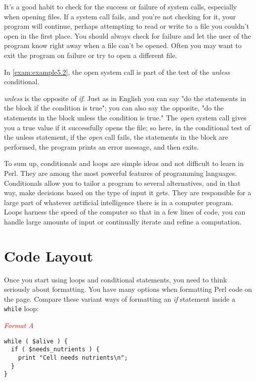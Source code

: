 It's a good habit to check for the success or failure of system calls, especially when opening files. If a system call fails, and you're not checking for it, your program will continue, perhaps attempting to read or write to a file you couldn't open in the first place. You should always check for failure and let the user of the program know right away when a file can't be opened. Often you may want to exit the program on failure or try to open a different file.  

In \autoref{exam:example5.2}, the open system call is part of the test of the \textit{unless} conditional.

\textit{unless} is the opposite of \textit{if}. Just as in English you can say "do the statements in the block if the condition is true"; you can also say the opposite, "do the statements in the block unless the condition is true." The \textit{open} system call gives you a true value if it successfully opens the file; so here, in the conditional test of the unless statement, if the \textit{open} call fails, the statements in the block are performed, the program prints an error message, and then exits.

To sum up, conditionals and loops are simple ideas and not difficult to learn in Perl. They are among the most powerful features of programming languages. Conditionals allow you to tailor a program to several alternatives, and in that way, make decisions based on the type of input it gets. They are responsible for a large part of whatever artificial intelligence there is in a computer program. Loops harness the speed of the computer so that in a few lines of code, you can handle large amounts of input or continually iterate and refine a computation. 

\section{Code Layout}
\label{sect:section5.2}
Once you start using loops and conditional statements, you need to think seriously about formatting. You have many options when formatting Perl code on the page. Compare these variant ways of formatting an \textit{if} statement inside a \verb|while| loop:

\textcolor{red}{\textit{Format A}}
\begin{adjustwidth}{1cm}{}
\begin{lstlisting}
while ( $alive ) {
  if ( $needs_nutrients ) {
    print "Cell needs nutrients\n";
  }
}
\end{lstlisting}
\end{adjustwidth}

